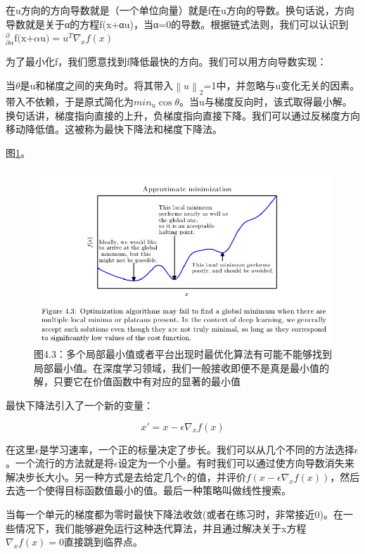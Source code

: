 在u方向的方向导数就是（一个单位向量）就是f在u方向的导数。换句话说，方向导数就是关于α的方程f(x+αu)，当α=0的导数。根据链式法则，我们可以认识到${}^{\partial}_{\partial\alpha}\textrm{f(x+$\alpha$u)}=u^T \nabla_x f(x)$

为了最小化f，我们愿意找到f降低最快的方向。我们可以用方向导数实现：
 
当$\theta$是u和梯度之间的夹角时。将其带入$\left \| u \right \|_2$=1中，并忽略与u变化无关的因素。带入不依赖，于是原式简化为$min_u \cos\theta$。当u与梯度反向时，该式取得最小解。换句话讲，梯度指向直接的上升，负梯度指向直接下降。我们可以通过反梯度方向移动降低值。这被称为最快下降法和梯度下降法。

图\ref{fig:4_3}。
\begin{figure}[htbp] %
   \centering
   \includegraphics[width=6in]{fig/chap4/4_3.jpg} 
   \caption{图4.3：多个局部最小值或者平台出现时最优化算法有可能不能够找到局部最小值。在深度学习领域，我们一般接收即便不是真是最小值的解，只要它在价值函数中有对应的显著的最小值}
   \label{fig:4_3}
\end{figure}

最快下降法引入了一个新的变量：

\begin{equation}
x'=x-\epsilon\nabla_x f(x)
\end{equation}

在这里$\epsilon$是学习速率，一个正的标量决定了步长。我们可以从几个不同的方法选择$\epsilon$。一个流行的方法就是将$\epsilon$设定为一个小量。有时我们可以通过使方向导数消失来解决步长大小。另一种方式是去给定几个$\epsilon$的值，并评价$f(x-\epsilon\nabla_x f(x))$，然后去选一个使得目标函数值最小的值。最后一种策略叫做线性搜索。

当每一个单元的梯度都为零时最快下降法收敛(或者在练习时，非常接近0)。在一些情况下，我们能够避免运行这种迭代算法，并且通过解决关于x方程$\nabla_x f(x)=0$直接跳到临界点。

